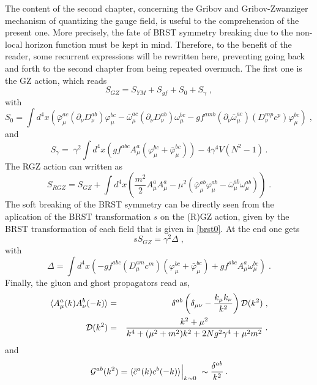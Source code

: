 The content of the second chapter, concerning the Gribov and Gribov-Zwanziger mechanism of
quantizing the gauge field, is useful to the comprehension of the present one. More precisely,
the fate of BRST symmetry breaking due to the non-local horizon function must be kept in mind.
Therefore, to the benefit of the reader, some recurrent expressions will be rewritten here,
preventing going back and forth to the second chapter from being repeated overmuch. The first
one is the GZ action, which reads
\begin{equation} 
S_{GZ} = S_{YM} + S_{gf} + S_0+S_\gamma  \;, 
\label{sgz5}
\end{equation}
with
\begin{equation}
S_0 =\int d^{4}x \left( {\bar \varphi}^{ac}_{\mu} (\partial_\nu D^{ab}_{\nu} )
\varphi^{bc}_{\mu} - {\bar \omega}^{ac}_{\mu}  (\partial_\nu D^{ab}_{\nu} ) \omega^{bc}_{\mu}
- gf^{amb} (\partial_\nu  {\bar \omega}^{ac}_{\mu} ) (D^{mp}_{\nu}c^p) \varphi^{bc}_{\mu}
\right) \;, \label{s05}
\end{equation}
and 
\begin{equation}
S_\gamma =\; \gamma^{2} \int d^{4}x \left( gf^{abc}A^{a}_{\mu}(\varphi^{bc}_{\mu} + {\bar
\varphi}^{bc}_{\mu})\right)-4 \gamma^4V (N^2-1)\,.
\label{hfl5}
\end{equation} 
The RGZ action can written as
\begin{equation}
S_{RGZ} = S_{GZ} + \int d^4x \left(  \frac{m^2}{2} A^a_\mu A^a_\mu  - \mu^2 \left( {\bar
\varphi}^{ab}_{\mu}  { \varphi}^{ab}_{\mu} -  {\bar \omega}^{ab}_{\mu}  { \omega}^{ab}_{\mu}
\right)   \right)  \;.
\label{rgz5}
\end{equation}
The soft breaking of the BRST symmetry can be directly seen from the aplication of the BRST
transformation $s$ on the (R)GZ action, given by the BRST transformation of each field that is
given in \eqref{brst0}. At the
end one gets
\begin{equation}
s S_{GZ} = \gamma^2 \Delta  \;, 
\label{brstbrr5}
\end{equation}
with
\begin{equation}
\Delta = \int d^{4}x \left( - gf^{abc} (D_\mu^{am}c^m) (\varphi^{bc}_{\mu} + {\bar
\varphi}^{bc}_{\mu})   + g f^{abc}A^a_\mu \omega^{bc}_\mu            \right)  \;.
\label{brstb15}
\end{equation}
Finally, the gluon and ghost propagators read as,
\begin{eqnarray} 
\langle  A^a_\mu(k)  A^b_\nu(-k) \rangle  & = &  \delta^{ab}  \left(\delta_{\mu\nu} -
\frac{k_\mu k_\nu}{k^2}     \right)   {\cal D}(k^2) \;, 
\label{glrgz5} \\
{\cal D}(k^2) & = & \frac{k^2 +\mu^2}{k^4 + (\mu^2+m^2)k^2 + 2Ng^2\gamma^4 + \mu^2 m^2}  \;.
\label{Dg5}
\end{eqnarray} 
and
\begin{equation}
{\cal G}^{ab}(k^2) = \langle  {\bar c}^{a} (k)  c^b(-k) \rangle \Big|_{k\sim 0} \; \sim
\frac{\delta^{ab}}{k^2}   \,.
\label{ghrgz5} 
\end{equation}

